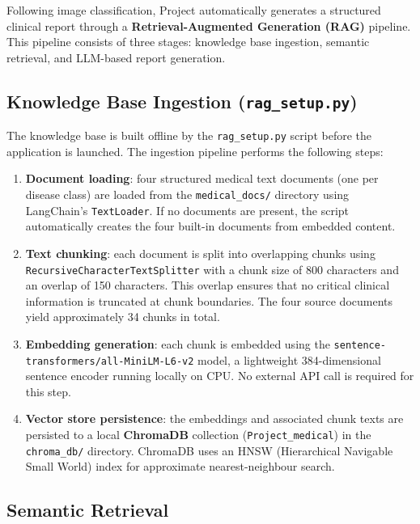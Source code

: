 \documentclass[12pt]{report}
\begin{document}
Following image classification, Project automatically generates a structured clinical report through a \textbf{Retrieval-Augmented Generation (RAG)} pipeline. This pipeline consists of three stages: knowledge base ingestion, semantic retrieval, and LLM-based report generation.

\subsection{Knowledge Base Ingestion (\texttt{rag\_setup.py})}

The knowledge base is built offline by the \texttt{rag\_setup.py} script before the application is launched. The ingestion pipeline performs the following steps:

\begin{enumerate}
    \item \textbf{Document loading}: four structured medical text documents (one per disease class) are loaded from the \texttt{medical\_docs/} directory using LangChain's \texttt{TextLoader}. If no documents are present, the script automatically creates the four built-in documents from embedded content.

    \item \textbf{Text chunking}: each document is split into overlapping chunks using \texttt{RecursiveCharacterTextSplitter} with a chunk size of 800 characters and an overlap of 150 characters. This overlap ensures that no critical clinical information is truncated at chunk boundaries. The four source documents yield approximately 34 chunks in total.

    \item \textbf{Embedding generation}: each chunk is embedded using the \texttt{sentence-transformers/all-MiniLM-L6-v2} model, a lightweight 384-dimensional sentence encoder running locally on CPU. No external API call is required for this step.

    \item \textbf{Vector store persistence}: the embeddings and associated chunk texts are persisted to a local \textbf{ChromaDB} collection (\texttt{Project\_medical}) in the \texttt{chroma\_db/} directory. ChromaDB uses an HNSW (Hierarchical Navigable Small World) index for approximate nearest-neighbour search.
\end{enumerate}

\subsection{Semantic Retrieval}
\end{document}

